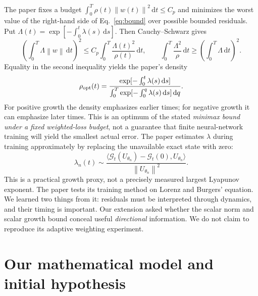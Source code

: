 \documentclass[11pt,a4paper]{article}
\newcommand{\norm}[1]{\left\lVert #1\right\rVert}
\newcommand{\dd}{\,\mathrm{d}}
\begin{document}
The paper fixes a budget $\int_0^T\rho(t)\norm{w(t)}^2\dd t\leq C_p$ and minimizes the worst value of the right-hand side of Eq.~\eqref{eq:bound} over possible bounded residuals. Put $\Lambda(t)=\exp[-\int_0^t\lambda(s)\dd s]$. Then Cauchy--Schwarz gives
\begin{equation}
\left(\int_0^T\Lambda\norm{w}\dd t\right)^2
\leq C_p\int_0^T\frac{\Lambda(t)^2}{\rho(t)}\dd t,
\qquad
\int_0^T\frac{\Lambda^2}{\rho}\dd t\geq\left(\int_0^T\Lambda\dd t\right)^2.
\end{equation}
Equality in the second inequality yields the paper's density
\begin{equation}\label{eq:rho}
\rho_{\rm opt}(t)=\frac{\exp[-\int_0^t\lambda(s)\dd s]}
{\int_0^T\exp[-\int_0^q\lambda(s)\dd s]\dd q}.
\end{equation}
For positive growth the density emphasizes earlier times; for negative growth it can emphasize later times. This is an optimum of the stated \emph{minimax bound under a fixed weighted-loss budget}, not a guarantee that finite neural-network training will yield the smallest actual error. The paper estimates $\lambda$ during training approximately by replacing the unavailable exact state with zero:
\begin{equation}\label{eq:lambdaest}
\lambda_n(t)\sim
\frac{\langle\mathcal G_t(U_{\theta_n})-\mathcal G_t(0),U_{\theta_n}\rangle}
{\norm{U_{\theta_n}}^2}.
\end{equation}
This is a practical growth proxy, not a precisely measured largest Lyapunov exponent. The paper tests its training method on Lorenz and Burgers' equation. We learned two things from it: residuals must be interpreted through dynamics, and their timing is important. Our extension asked whether the scalar norm and scalar growth bound conceal useful \emph{directional} information. We do not claim to reproduce its adaptive weighting experiment.

\section{Our mathematical model and initial hypothesis}
\end{document}
